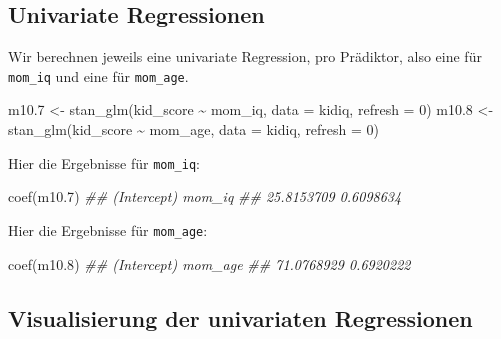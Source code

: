 \documentclass[
  a4paper,
  DIV=11]{scrreprt}
\newenvironment{Shaded}{\begin{snugshade}}{\end{snugshade}}
\newcommand{\AttributeTok}[1]{\textcolor[rgb]{0.40,0.45,0.13}{#1}}
\newcommand{\DecValTok}[1]{\textcolor[rgb]{0.68,0.00,0.00}{#1}}
\newcommand{\DocumentationTok}[1]{\textcolor[rgb]{0.37,0.37,0.37}{\textit{#1}}}
\newcommand{\FloatTok}[1]{\textcolor[rgb]{0.68,0.00,0.00}{#1}}
\newcommand{\FunctionTok}[1]{\textcolor[rgb]{0.28,0.35,0.67}{#1}}
\newcommand{\NormalTok}[1]{\textcolor[rgb]{0.00,0.23,0.31}{#1}}
\newcommand{\OtherTok}[1]{\textcolor[rgb]{0.00,0.23,0.31}{#1}}
\newcommand{\SpecialCharTok}[1]{\textcolor[rgb]{0.37,0.37,0.37}{#1}}
\theoremstyle{definition}
\theoremstyle{remark}
\begin{document}
\hypertarget{univariate-regressionen}{%
\subsection{Univariate Regressionen}\label{univariate-regressionen}}

Wir berechnen jeweils eine univariate Regression, pro Prädiktor, also
eine für \texttt{mom\_iq} und eine für \texttt{mom\_age}.

\begin{Shaded}
\begin{Highlighting}[]
\NormalTok{m10}\FloatTok{.7} \OtherTok{\textless{}{-}} \FunctionTok{stan\_glm}\NormalTok{(kid\_score }\SpecialCharTok{\textasciitilde{}}\NormalTok{ mom\_iq, }\AttributeTok{data =}\NormalTok{ kidiq, }\AttributeTok{refresh =} \DecValTok{0}\NormalTok{)}
\NormalTok{m10}\FloatTok{.8} \OtherTok{\textless{}{-}} \FunctionTok{stan\_glm}\NormalTok{(kid\_score }\SpecialCharTok{\textasciitilde{}}\NormalTok{ mom\_age, }\AttributeTok{data =}\NormalTok{ kidiq, }\AttributeTok{refresh =} \DecValTok{0}\NormalTok{)}
\end{Highlighting}
\end{Shaded}

Hier die Ergebnisse für \texttt{mom\_iq}:

\begin{Shaded}
\begin{Highlighting}[]
\FunctionTok{coef}\NormalTok{(m10}\FloatTok{.7}\NormalTok{)}
\DocumentationTok{\#\# (Intercept)      mom\_iq }
\DocumentationTok{\#\#  25.8153709   0.6098634}
\end{Highlighting}
\end{Shaded}

Hier die Ergebnisse für \texttt{mom\_age}:

\begin{Shaded}
\begin{Highlighting}[]
\FunctionTok{coef}\NormalTok{(m10}\FloatTok{.8}\NormalTok{)}
\DocumentationTok{\#\# (Intercept)     mom\_age }
\DocumentationTok{\#\#  71.0768929   0.6920222}
\end{Highlighting}
\end{Shaded}

\hypertarget{visualisierung-der-univariaten-regressionen}{%
\subsection{Visualisierung der univariaten
Regressionen}\label{visualisierung-der-univariaten-regressionen}}
\end{document}

